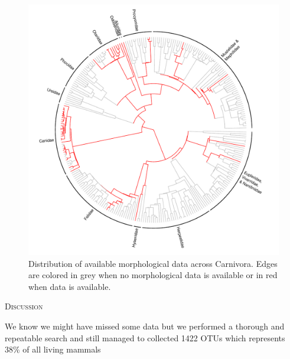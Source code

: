 \documentclass[12pt,letterpaper]{article}
\renewcommand{\section}[1]{%
\bigskip
\begin{center}
\begin{Large}
\normalfont\scshape #1
\medskip
\end{Large}
\end{center}}
\renewcommand{\subsection}[1]{%
\bigskip
\begin{center}
\begin{large}
\normalfont\itshape #1
\end{large}
\end{center}}
\begin{document}
\begin{figure}[!htbp]
\centering
    \includegraphics[width=1\textwidth]{example_coverageB.pdf}
\caption{Distribution of available morphological data across Carnivora. Edges are colored in grey when no morphological data is available or in red when data is available.}
\label{Figure_example_coverageB}
\end{figure}



%
%

\section{Discussion}
We know we might have missed some data but we performed a thorough and repeatable search and still managed to collected 1422 OTUs which represents 38\% of all living mammals
\end{document}
